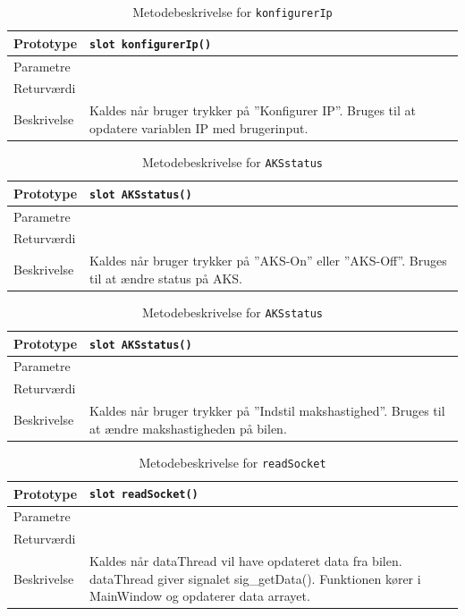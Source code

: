 \begin{table}[H]
\begin{tabularx}{\textwidth}{| L{2.5 cm} | Z |} \hline
Prototype & \texttt{slot konfigurerIp()} \\\hline
Parametre &   \\\hline
Returværdi &  \\\hline
Beskrivelse & Kaldes når bruger trykker på ''Konfigurer IP''. Bruges til at opdatere variablen IP med brugerinput. \\\hline
\end{tabularx}
\caption{Metodebeskrivelse for \texttt{konfigurerIp}}
\label{table:met_konfigurerIp}
\end{table}

\begin{table}[H]
\begin{tabularx}{\textwidth}{| L{2.5 cm} | Z |} \hline
Prototype & \texttt{slot AKSstatus()} \\\hline
Parametre &   \\\hline
Returværdi &  \\\hline
Beskrivelse & Kaldes når bruger trykker på ''AKS-On'' eller ''AKS-Off''. Bruges til at ændre status på AKS. \\\hline
\end{tabularx}
\caption{Metodebeskrivelse for \texttt{AKSstatus}}
\label{table:met_AKSstatus}
\end{table}

\begin{table}[H]
\begin{tabularx}{\textwidth}{| L{2.5 cm} | Z |} \hline
Prototype & \texttt{slot AKSstatus()} \\\hline
Parametre &   \\\hline
Returværdi &  \\\hline
Beskrivelse & Kaldes når bruger trykker på ''Indstil makshastighed''. Bruges til at ændre makshastigheden på bilen. \\\hline
\end{tabularx}
\caption{Metodebeskrivelse for \texttt{AKSstatus}}
\label{table:met_AKSstatus}
\end{table}

\begin{table}[H]
\begin{tabularx}{\textwidth}{| L{2.5 cm} | Z |} \hline
Prototype & \texttt{slot readSocket()} \\\hline
Parametre &   \\\hline
Returværdi &  \\\hline
Beskrivelse & Kaldes når dataThread vil have opdateret data fra bilen. dataThread giver signalet sig\_getData(). Funktionen kører i MainWindow og opdaterer data arrayet.\\\hline
\end{tabularx}
\caption{Metodebeskrivelse for \texttt{readSocket}}
\label{table:met_readSocket}
\end{table}


